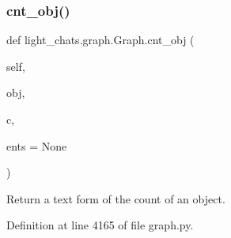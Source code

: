 \subsubsection{\texorpdfstring{cnt\+\_\+obj()}{cnt\_obj()}}
{\footnotesize\ttfamily def light\+\_\+chats.\+graph.\+Graph.\+cnt\+\_\+obj (\begin{DoxyParamCaption}\item[{}]{self,  }\item[{}]{obj,  }\item[{}]{c,  }\item[{}]{ents = {\ttfamily None} }\end{DoxyParamCaption})}

\begin{DoxyVerb}Return a text form of the count of an object.
\end{DoxyVerb}
 

Definition at line 4165 of file graph.\+py.


